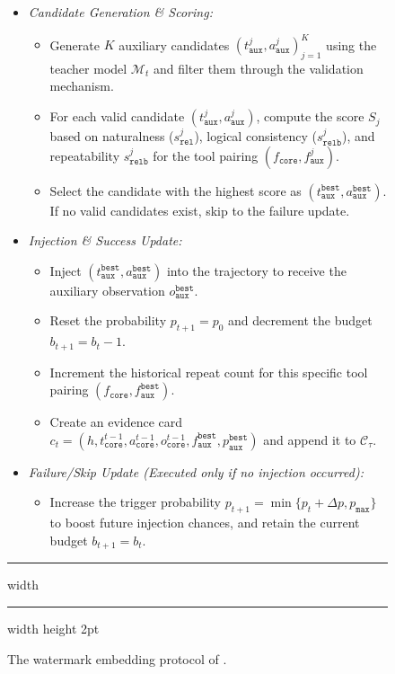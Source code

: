 \begin{figure}[!t]
\begin{itemize}
    \item \textit{Candidate Generation \& Scoring:}
    \begin{itemize}
        \item Generate $K$ auxiliary candidates $(t_{\mathtt{aux}}^j, a_{\mathtt{aux}}^j)_{j=1}^K$ using the teacher model $\mathcal{M}_t$ and filter them through the validation mechanism.
        \item For each valid candidate $(t_{\mathtt{aux}}^j, a_{\mathtt{aux}}^j)$, compute the score $S_j$ based on naturalness ($s_{\mathtt{rel}}^j$), logical consistency ($s_{\mathtt{relb}}^j$), and repeatability $s_{\mathtt{relb}}^j$ for the tool pairing $(f_{\mathtt{core}}, f_{\mathtt{aux}}^j)$.
        \item Select the candidate with the highest score as $(t_{\mathtt{aux}}^{\mathtt{best}}, a_{\mathtt{aux}}^{\mathtt{best}})$. If no valid candidates exist, skip to the failure update.
    \end{itemize}

    \item \textit{Injection \& Success Update:}
    \begin{itemize}
        \item Inject $(t_{\mathtt{aux}}^{\mathtt{best}}, a_{\mathtt{aux}}^{\mathtt{best}})$ into the trajectory to receive the auxiliary observation $o_{\mathtt{aux}}^{\mathtt{best}}$.
        \item Reset the probability $p_{t+1} = p_0$ and decrement the budget $b_{t+1} = b_t - 1$.
        \item Increment the historical repeat count for this specific tool pairing $(f_{\mathtt{core}}, f_{\mathtt{aux}}^{\mathtt{best}})$.
        \item Create an evidence card $c_t = (h, t_{\mathtt{core}}^{t-1}, a_{\mathtt{core}}^{t-1}, o_{\mathtt{core}}^{t-1}, f_{\mathtt{aux}}^{\mathtt{best}}, p_{\mathtt{aux}}^{\mathtt{best}})$ and append it to $\mathcal{C}_\tau$.
    \end{itemize}

    \item \textit{Failure/Skip Update (Executed only if no injection occurred):}
    \begin{itemize}
        \item Increase the trigger probability $p_{t+1} = \min\{p_t + \Delta p, p_{\mathtt{max}}\}$ to boost future injection chances, and retain the current budget $b_{t+1} = b_t$.
    \end{itemize}
\end{itemize}

\hrule width \hsize \kern 1mm \hrule width \hsize height 2pt 
\caption{The watermark embedding protocol of \name{}. }
\label{fig:watermark_embedding_protocol}
\end{figure}

